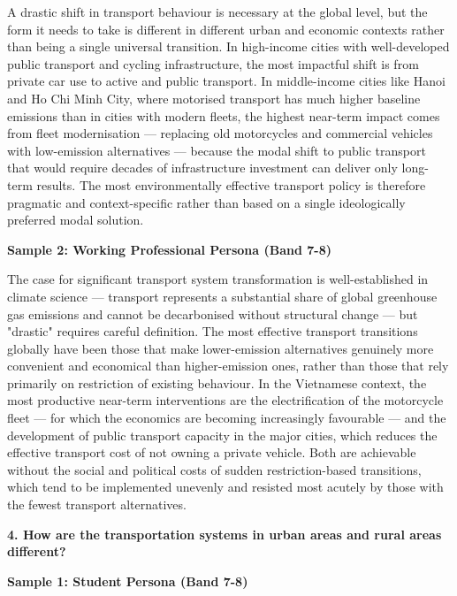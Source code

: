 A drastic shift in transport behaviour is necessary at the global level, but the form it needs to take is different in different urban and economic contexts rather than being a single universal transition. In high-income cities with well-developed public transport and cycling infrastructure, the most impactful shift is from private car use to active and public transport. In middle-income cities like Hanoi and Ho Chi Minh City, where motorised transport has much higher baseline emissions than in cities with modern fleets, the highest near-term impact comes from fleet modernisation — replacing old motorcycles and commercial vehicles with low-emission alternatives — because the modal shift to public transport that would require decades of infrastructure investment can deliver only long-term results. The most environmentally effective transport policy is therefore pragmatic and context-specific rather than based on a single ideologically preferred modal solution.

\textbf{Sample 2: Working Professional Persona (Band 7-8)}

The case for significant transport system transformation is well-established in climate science — transport represents a substantial share of global greenhouse gas emissions and cannot be decarbonised without structural change — but "drastic" requires careful definition. The most effective transport transitions globally have been those that make lower-emission alternatives genuinely more convenient and economical than higher-emission ones, rather than those that rely primarily on restriction of existing behaviour. In the Vietnamese context, the most productive near-term interventions are the electrification of the motorcycle fleet — for which the economics are becoming increasingly favourable — and the development of public transport capacity in the major cities, which reduces the effective transport cost of not owning a private vehicle. Both are achievable without the social and political costs of sudden restriction-based transitions, which tend to be implemented unevenly and resisted most acutely by those with the fewest transport alternatives.

\separator

\begin{ieltsquestion}
\textbf{4. How are the transportation systems in urban areas and rural areas different?}
\end{ieltsquestion}
\textbf{Sample 1: Student Persona (Band 7-8)}

